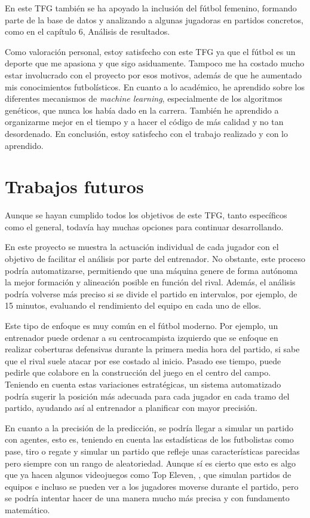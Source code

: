 En este TFG también se ha apoyado la inclusión del fútbol femenino, formando parte de la base de datos y analizando a algunas jugadoras en partidos concretos, como en el capítulo 6, Análisis de resultados.

Como valoración personal, estoy satisfecho con este TFG ya que el fútbol es un deporte que me apasiona y que sigo asiduamente. Tampoco me ha costado mucho estar involucrado con el proyecto  por esos motivos, además de que he aumentado mis conocimientos futbolísticos. En cuanto a lo académico, he aprendido sobre los diferentes mecanismos de \textit{machine learning}, especialmente de los algoritmos genéticos, que nunca los había dado en la carrera. También he aprendido a organizarme mejor en el tiempo y a hacer el código de más calidad y no tan desordenado. En conclusión, estoy satisfecho con el trabajo realizado y con lo aprendido.

\section{Trabajos futuros}
Aunque se hayan cumplido todos los objetivos de este TFG, tanto específicos como el general, todavía hay muchas opciones para continuar desarrollando.

En este proyecto se muestra la actuación individual de cada jugador con el objetivo de facilitar el análisis por parte del entrenador. No obstante, este proceso podría automatizarse, permitiendo que una máquina genere de forma autónoma la mejor formación y alineación posible en función del rival. Además, el análisis podría volverse más preciso si se divide el partido en intervalos, por ejemplo, de 15 minutos, evaluando el rendimiento del equipo en cada uno de ellos.

Este tipo de enfoque es muy común en el fútbol moderno. Por ejemplo, un entrenador puede ordenar a su centrocampista izquierdo que se enfoque en realizar coberturas defensivas durante la primera media hora del partido, si sabe que el rival suele atacar por ese costado al inicio. Pasado ese tiempo, puede pedirle que colabore en la construcción del juego en el centro del campo. Teniendo en cuenta estas variaciones estratégicas, un sistema automatizado podría sugerir la posición más adecuada para cada jugador en cada tramo del partido, ayudando así al entrenador a planificar con mayor precisión.

En cuanto a la precisión de la predicción, se podría llegar a simular un partido con agentes, esto es, teniendo en cuenta las estadísticas de los futbolistas como pase, tiro o regate y simular un partido que refleje unas características parecidas pero siempre con un rango de aleatoriedad. Aunque sí es cierto que esto es algo que ya hacen algunos videojuegos como Top Eleven, \cite{Top_eleven}, que simulan partidos de equipos e incluso se pueden ver a los jugadores moverse durante el partido, pero se podría intentar hacer de una manera mucho más precisa y con fundamento matemático.

